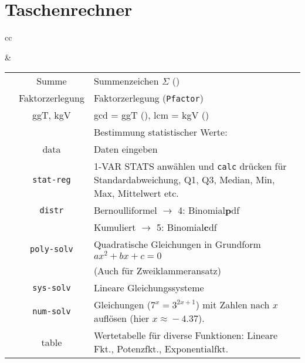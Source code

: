 \newpage
\headerUndFooterJedeSeite{}

\section*{Taschenrechner}

\begin{tabular}{cc}


&

\begin{tabular}{c|c|p{80mm}}\hline
\tiprobutton{math}         &Summe             & Summenzeichen $\Sigma$ (\tiprobutton{5})\\
                           &Faktorzerlegung   & Faktorzerlegung (\tiprobutton{4}\texttt{Pfactor})\\
                           & ggT, kgV         & gcd = ggT
(\tiprobutton{3}), lcm = kgV (\tiprobutton{2})\\\hline
                           &                  & Bestimmung statistischer Werte:\\
\tiprobutton{data}         & data             & Daten eingeben\\
                           &\texttt{stat-reg} & 1-VAR STATS anwählen
und \texttt{calc} drücken für Standardabweichung, Q1, Q3, Median, Min,
Max, Mittelwert etc.\\
                           &\texttt{distr}    & Bernoulliformel $\rightarrow$ 4: Binomial\textbf{p}df\\
                           &                  & Kumuliert $\rightarrow$ 5: Binomial\textbf{c}df\\\hline
\tiprobutton{cos_poly-solv}&\texttt{poly-solv}&  Quadratische Gleichungen in Grundform $ax^2+bx+c=0$\\
                           &                  &  (Auch für Zweiklammeransatz)\\\hline
\tiprobutton{tan_sys-solv} &\texttt{sys-solv} &  Lineare Gleichungssysteme\\\hline
\tiprobutton{sin_num-solv} &\texttt{num-solv} &  Gleichungen ($7^x=3^{2x+1}$) mit Zahlen nach $x$ auf\/lösen (hier $x\approx{}-4.37$).\\\hline
\tiprobutton{table}        & table            &  Wertetabelle für diverse Funktionen: Lineare Fkt., Potenzfkt., Exponentialfkt.\\\hline

\end{tabular}
\end{tabular}
